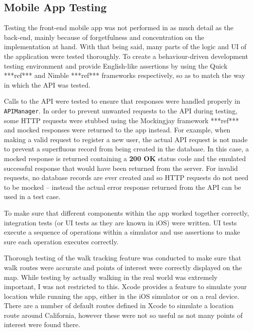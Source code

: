 \subsection{Mobile App Testing}

Testing the front-end mobile app was not performed in as much detail as the back-end, mainly because of forgetfulness and concentration on the implementation at hand. With that being said, many parts of the logic and UI of the application were tested thoroughly. To create a behaviour-driven development testing environment and provide English-like assertions by using the Quick ***ref*** and Nimble ***ref*** frameworks respectively, so as to match the way in which the API was tested.

Calls to the API were tested to ensure that responses were handled properly in \verb|APIManager|. In order to prevent unwanted requests to the API during testing, some HTTP requests were stubbed using the Mockingjay framework ***ref*** and mocked responses were returned to the app instead. For example, when making a valid request to register a new user, the actual API request is not made to prevent a superfluous record from being created in the database. In this case, a mocked response is returned containing a \textbf{200 OK} status code and the emulated successful response that would have been returned from the server. For invalid requests, no database records are ever created and so HTTP requests do not need to be mocked -- instead the actual error response returned from the API can be used in a test case.

To make sure that different components within the app worked together correctly, integration tests (or UI tests as they are known in iOS) were written. UI tests execute a sequence of operations within a simulator and use assertions to make sure each operation executes correctly.



Thorough testing of the walk tracking feature was conducted to make sure that walk routes were accurate and points of interest were correctly displayed on the map. While testing by actually walking in the real world was extremely important, I was not restricted to this. Xcode provides a feature to simulate your location while running the app, either in the iOS simulator or on a real device. There are a number of default routes defined in Xcode to simulate a location route around California, however these were not so useful as not many points of interest were found there.

